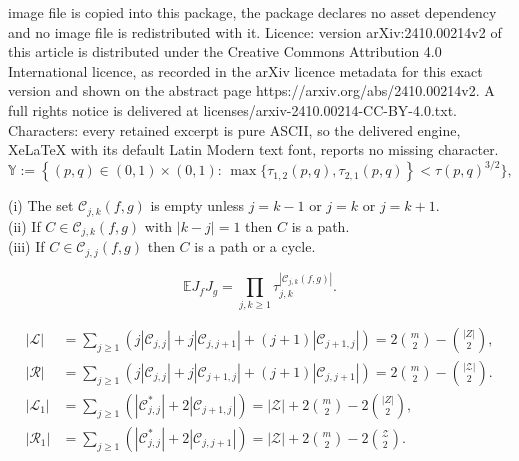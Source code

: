 \documentclass[10pt,a4paper]{amsart}
\def\CC{\mathscr{C}}
\def\E{\mathbb{E}}
\def\LL{\mathscr{L}}
\def\RR{\mathscr{R}}
\def\Y{\mathbb{Y}}
\def\ZZ{\mathscr Z}
\begin{document}
image file is copied into this package, the package declares no asset dependency and no image file is redistributed with it. Licence: version arXiv:2410.00214v2 of this article is distributed under the Creative Commons Attribution 4.0 International licence, as recorded in the arXiv licence metadata for this exact version and shown on the abstract page https://arxiv.org/abs/2410.00214v2. A full rights notice is delivered at licenses/arxiv-2410.00214-CC-BY-4.0.txt. Characters: every retained excerpt is pure ASCII, so the delivered engine, XeLaTeX with its default Latin Modern text font, reports no missing character.
\begin{equation}
\label{thespis}
\Y:=\left\{(p,q) \in (0,1)\times (0,1):\, \max\{\tau_{1,2}(p,q), \tau_{2,1}(p,q)\right\} 
< \tau(p,q)^{3/2}\},
\end{equation}

\begin{lemma}
\label{ccut}
(i) The set $\CC_{j,k}(f,g)$ is empty unless $j=k-1$ or $j=k$ or $j=k+1$.
\\
(ii) If $C \in \CC_{j,k}(f,g)$ with $|k-j|=1$ then $C$ is a path.
\\
(iii) If $C \in \CC_{j,j}(f,g)$ then $C$ is a path or a cycle.
\end{lemma}

\begin{equation}
\label{N2tris} 
\E J_f J_g = \prod_{j,k \ge 1} \tau_{j,k}^{|\CC_{j,k}(f,g)|}.
\end{equation}

\begin{align}
|\LL| &= 
\sum_{j\ge 1} (j |\CC_{j,j}| + j |\CC_{j,j+1}| + (j+1) |\CC_{j+1,j}| )
= 2 \binom{m}{2} - \binom{|Z|}{2},
\label{left}
\\
|\RR|&=\sum_{j\ge 1} (j |\CC_{j,j}| + j |\CC_{j+1,j}| + (j+1) |\CC_{j,j+1}| )
= 2 \binom{m}{2} - \binom{|\ZZ|}{2}.
\label{right}
\\
|\LL_1|&=\sum_{j\ge 1} (|\CC_{j,j}^*| + 2 |\CC_{j+1,j}|)
= |\ZZ| +  2 \binom{m}{2} - 2 \binom{|Z|}{2},
\label{left1}
\\
|\RR_1|&=\sum_{j\ge 1} (|\CC_{j,j}^*| + 2 |\CC_{j,j+1}|)
= |\ZZ| +  2 \binom{m}{2} - 2 \binom{\ZZ}{2}.
\label{right1}
\end{align}
\end{document}
